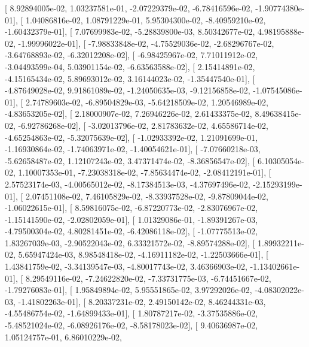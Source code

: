 \documentclass{article}
\begin{document}
       [  8.92894005e-02,   1.03237581e-01,  -2.07229379e-02,
         -6.78416596e-02,  -1.90774380e-01],
       [  1.04086816e-02,   1.08791229e-01,   5.95304300e-02,
         -8.40959210e-02,  -1.60432379e-01],
       [  7.07699983e-02,  -5.28839800e-03,   8.50342677e-02,
          4.98195888e-02,  -1.99996022e-01],
       [ -7.98833848e-02,  -4.75529036e-02,  -2.68296767e-02,
         -3.64768893e-02,  -6.32012208e-02],
       [ -6.98425967e-02,   7.71011912e-02,  -3.04493599e-04,
          5.03901154e-02,  -6.63563588e-02],
       [  2.15414891e-02,  -4.15165434e-02,   5.89693012e-02,
          3.16144023e-02,  -1.35447540e-01],
       [ -4.87649028e-02,   9.91861089e-02,  -1.24050635e-03,
         -9.12156858e-02,  -1.07545086e-01],
       [  2.74789603e-02,  -6.89504829e-03,  -5.64218509e-02,
          1.20546989e-02,  -4.83653205e-02],
       [  2.18000907e-02,   7.26946226e-02,   2.61433375e-02,
          8.49638415e-02,  -6.92786268e-02],
       [ -3.02013796e-02,   2.81783632e-02,   4.65586714e-02,
         -4.65254863e-02,  -5.32075639e-02],
       [ -1.02933392e-02,   1.21091699e-01,  -1.16930864e-02,
         -1.74063971e-02,  -1.40054621e-01],
       [ -7.07660218e-03,  -5.62658487e-02,   1.12107243e-02,
          3.47371474e-02,  -8.36856547e-02],
       [  6.10305054e-02,   1.10007353e-01,  -7.23038318e-02,
         -7.85634474e-02,  -2.08412191e-01],
       [  2.57523174e-03,  -4.00565012e-02,  -8.17384513e-03,
         -4.37697496e-02,  -2.15293199e-01],
       [  2.07451108e-02,   7.46105829e-02,  -8.33937528e-02,
         -9.87809044e-02,  -1.06022615e-01],
       [  8.59816075e-02,  -6.87220773e-02,  -2.83076967e-02,
         -1.15141590e-02,  -2.02802059e-01],
       [  1.01329086e-01,  -1.89391267e-03,  -4.79500304e-02,
          4.80281451e-02,  -6.42086118e-02],
       [ -1.07775513e-02,   1.83267039e-03,  -2.90522043e-02,
          6.33321572e-02,  -8.89574288e-02],
       [  1.89932211e-02,   5.65947424e-03,   8.98548418e-02,
         -4.16911182e-02,  -1.22503666e-01],
       [  1.43841759e-02,  -3.34139547e-03,  -4.80017743e-02,
          3.46366903e-02,  -1.13402661e-01],
       [  8.29549116e-02,  -7.24622820e-02,  -7.33731775e-03,
         -6.74451667e-02,  -1.79276083e-01],
       [  1.95849894e-02,   5.95551865e-02,   3.97292026e-02,
         -4.08302022e-03,  -1.41802263e-01],
       [  8.20337231e-02,   2.49150142e-02,   8.46244331e-03,
         -4.55486754e-02,  -1.64899433e-01],
       [  1.80787217e-02,  -3.37535886e-02,  -5.48521024e-02,
         -6.08926176e-02,  -8.58178023e-02],
       [  9.40636987e-02,   1.05124757e-01,   6.86010229e-02,
\end{document}
